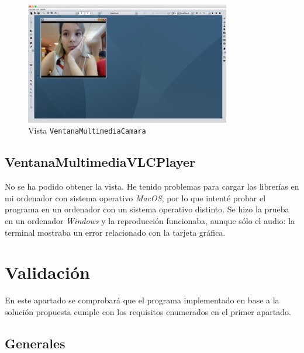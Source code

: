 \vskip0.3cm
\begin{figure}[H]
 \centering
  \includegraphics[width=0.8\textwidth]{video/webcam.jpg}
 \caption{Vista \texttt{VentanaMultimediaCamara}}
 \label{diseño}
 \end{figure}

\subsection{VentanaMultimediaVLCPlayer} 
 No se ha podido obtener la vista. He tenido problemas para cargar las librerías en mi ordenador con sistema operativo \textit{MacOS}, por lo que intenté probar el programa en un ordenador con un sistema operativo distinto. Se hizo la prueba en un ordenador \textit{Windows} y la reproducción funcionaba, aunque sólo el audio: la terminal mostraba un error relacionado con la tarjeta gráfica.
\clearpage
\section{Validación}
En este apartado se comprobará que el programa implementado en base a la solución propuesta cumple con los requisitos enumerados en el primer apartado.
\subsection{Generales}
